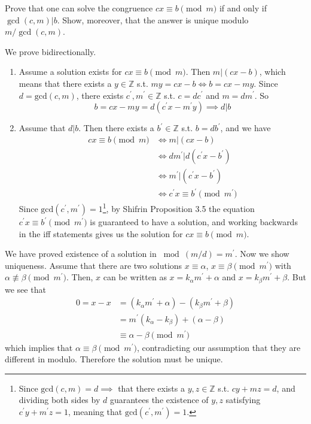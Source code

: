   \begin{exercise}[Shifrin 1.3.25]
    Prove that one can solve the congruence $cx \equiv b \pmod{m}$ if and only if $\gcd(c, m)|b$. Show, moreover, that the answer is unique modulo $m/\gcd(c, m)$.
  \end{exercise}
  \begin{solution}
    We prove bidirectionally. 
    \begin{enumerate}
      \item Assume a solution exists for $cx \equiv b \pmod{m}$. Then $m | (cx - b)$, which means that there exists a $y \in \mathbb{Z}$ s.t. $my = cx - b \iff b = cx - my$. Since $d = \mathrm{gcd}(c, m)$, there exists $c^\prime, m^\prime \in \mathbb{Z}$ s.t. $c = d c^\prime$ and $m = d m^\prime$. So 
      \begin{equation}
        b = cx - my = d (c^\prime x - m^\prime y) \implies d | b
      \end{equation} 

    \item Assume that $d | b$. Then there exists a $b^\prime \in \mathbb{Z}$ s.t. $b = d b^\prime$, and we have 
    \begin{align}
      cx \equiv b \pmod{m} & \iff m | (cx - b) \\
                           & \iff d m^\prime | d (c^\prime x - b^\prime) \\
                           & \iff m^\prime | (c^\prime x - b^\prime) \\
                           & \iff c^\prime x \equiv b^\prime \pmod{m^\prime} 
    \end{align}
    Since $\mathrm{gcd}(c^\prime, m^\prime) = 1$\footnote{Since $\mathrm{gcd}(c, m) = d \implies$ that there exists a $y, z \in \mathbb{Z}$ s.t. $c y + m z = d$, and dividing both sides by $d$ guarantees the existence of $y, z$ satisfying $c^\prime y + m^\prime z = 1$, meaning that $\mathrm{gcd}(c^\prime, m^\prime) = 1$.}, by Shifrin Proposition 3.5 the equation $c^\prime x \equiv b^\prime \pmod{m^\prime}$ is guaranteed to have a solution, and working backwards in the iff statements gives us the solution for $cx \equiv b \pmod{m}$. 
    \end{enumerate}

    We have proved existence of a solution in $\bmod{(m/d) = m^\prime}$. Now we show uniqueness. Assume that there are two solutions $x \equiv \alpha$, $x \equiv \beta \pmod{m^\prime}$ with $\alpha \not\equiv \beta \pmod{m^\prime}$. Then, $x$ can be written as $x = k_\alpha m^\prime + \alpha$ and $x = k_\beta m^\prime + \beta$. But we see that 
    \begin{align}
      0 = x - x & = (k_\alpha m^\prime + \alpha) - (k_\beta m^\prime + \beta) \\
                & = m^\prime (k_\alpha - k_\beta) + (\alpha - \beta) \\
                & \equiv \alpha - \beta \pmod{m^\prime}
    \end{align}
    which implies that $\alpha \equiv \beta \pmod{m^\prime}$, contradicting our assumption that they are different in modulo. Therefore the solution must be unique. 
  \end{solution}

